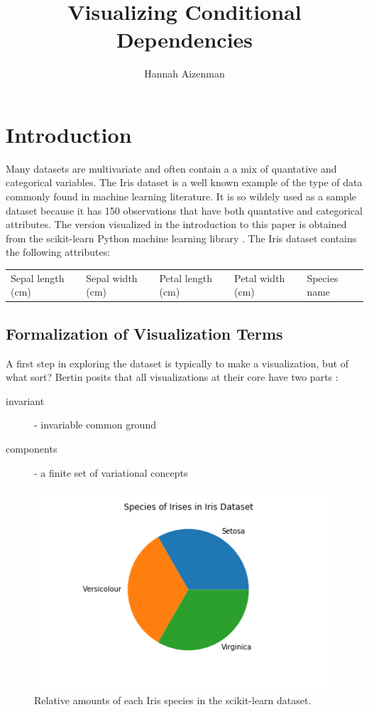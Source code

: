 \documentclass[letterpaper,onecolumn,titlepage]{Ythesis}
\title{Visualizing Conditional Dependencies}
\author{Hannah Aizenman}
\begin{document}
\makefrontmatter

\section{Introduction}
\label{sec:introduction}
Many datasets are multivariate and often contain a a mix of quantative and categorical variables. The Iris dataset \cite{fisher_use_1936-1, _uci_????} is a well known example of the type of data commonly found in machine learning literature. It is so wildely used as a sample dataset because it has 150 observations that have both quantative and categorical attributes. The version visualized in the introduction to this paper is obtained from the scikit-learn Python machine learning library \cite{scikit-learn}. The Iris dataset contains the following attributes:\\
\begin{tabular} {lllll}
Sepal length (cm) & Sepal width (cm) & Petal length (cm) & Petal width (cm) & Species name
\end{tabular}

\subsection{Formalization of Visualization Terms}

A first step in exploring the dataset is typically to make a visualization, but of what sort? Bertin posits that all visualizations at their core have two parts \cite{bertin_semiology_2011}:
\begin{description}
\item[invariant] - invariable common ground
\item[components] - a finite set of variational concepts
\end{description}

\begin{figure}
	\includegraphics[width=\textwidth]{intro/iris_pie}
  	\caption{Relative amounts of each Iris species in the scikit-learn dataset\cite{scikit-learn}.}
  	\label{fig:iris_pie}
\end{figure}
\end{document}

